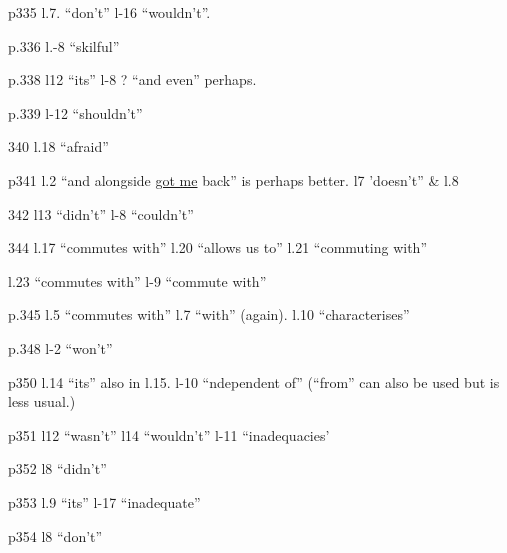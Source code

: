 
p335 l.7. ``don't'' l-16 ``wouldn't''.

p.336 l.-8 ``skilful''

p.338 l12 ``its'' l-8 ? ``and even'' perhaps.

p.339 l-12 ``shouldn't'' 

340 l.18 ``afraid''

p341 l.2 ``and alongside \uline{got me} back'' is perhaps better. l7 'doesn't'' \& l.8

342 l13 ``didn't'' l-8 ``couldn't''

344 l.17 ``commutes with'' l.20 ``allows us to'' l.21 ``commuting with''

l.23 ``commutes with'' l-9 ``commute with''

p.345 l.5 ``commutes with'' l.7 ``with'' (again). l.10 ``characterises''

p.348 l-2 ``won't''

p350 l.14 ``its'' also in l.15. l-10 ``ndependent of'' (``from'' can also be used but is less usual.)

p351 l12 ``wasn't'' l14 ``wouldn't'' l-11 ``inadequacies'

p352 l8 ``didn't''

p353 l.9 ``its'' l-17 ``inadequate''

p354 l8 ``don't''


